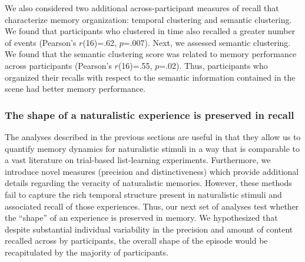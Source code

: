 \documentclass{article}
\begin{document}
{We also considered two additional across-participant measures of recall that characterize memory organization: temporal clustering and semantic clustering. We found that participants who clustered in time also recalled a greater number of events (Pearson's $r$(16)=.62, $p$=.007). Next, we assessed semantic clustering. We found that the semantic clustering score was related to memory performance across participants (Pearson's $r$(16)=.55, $p$=.02).  Thus, participants who organized their recalls with respect to the semantic information contained in the scene had better memory performance.

\subsubsection{The shape of a naturalistic experience is preserved in recall}
The analyses described in the previous sections are useful in that they allow us to quantify memory dynamics for naturalistic stimuli in a way that is comparable to a vast literature on trial-based list-learning experiments. Furthermore, we introduce novel measures (precision and distinctiveness) which provide additional details regarding the veracity of naturalistic memories. However, these methods fail to capture the rich temporal structure present in naturalistic stimuli and associated recall of those experiences. Thus, our next set of analyses test whether the ``shape'' of an experience is preserved in memory. We hypothesized that despite substantial individual variability in the precision and amount of content recalled across by participants, the overall shape of the episode would be recapitulated by the majority of participants.

}
\end{document}

